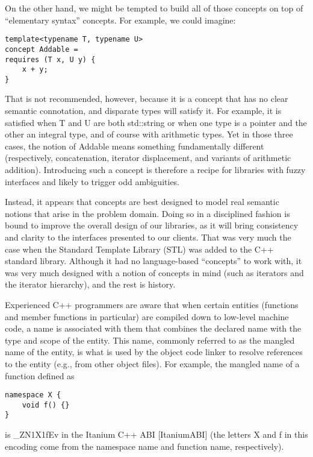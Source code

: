 On the other hand, we might be tempted to build all of those concepts on top of “elementary syntax” concepts. For example, we could imagine:

\begin{lstlisting}[style=styleCXX]
template<typename T, typename U>
concept Addable =
requires (T x, U y) {
	x + y;
}
\end{lstlisting}

That is not recommended, however, because it is a concept that has no clear semantic connotation, and disparate types will satisfy it. For example, it is satisfied when T and U are both std::string or when one type is a pointer and the other an integral type, and of course with arithmetic types. Yet in those three cases, the notion of Addable means something fundamentally different (respectively, concatenation, iterator displacement, and variants of arithmetic addition). Introducing such a concept is therefore a recipe for libraries with fuzzy interfaces and likely to trigger odd ambiguities.

Instead, it appears that concepts are best designed to model real semantic notions that arise in the problem domain. Doing so in a disciplined fashion is bound to improve the overall design of our libraries, as it will bring consistency and clarity to the interfaces presented to our clients. That was very much the case when the Standard Template Library (STL) was added to the C++ standard library. Although it had no language-based “concepts” to work with, it was very much designed with a notion of concepts in mind (such as iterators and the iterator hierarchy), and the rest is history.


Experienced C++ programmers are aware that when certain entities (functions and member functions in particular) are compiled down to low-level machine code, a name is associated with them that combines the declared name with the type and scope of the entity. This name, commonly referred to as the mangled name of the entity, is what is used by the object code linker to resolve references to the entity (e.g., from other object files). For example, the mangled name of a function defined as

\begin{lstlisting}[style=styleCXX]
namespace X {
	void f() {}
}
\end{lstlisting}

is \_ZN1X1fEv in the Itanium C++ ABI [ItaniumABI] (the letters X and f in this encoding come from the namespace name and function name, respectively).

